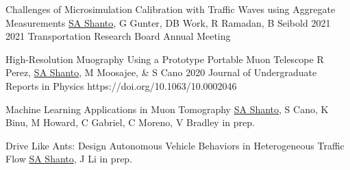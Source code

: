 
\begin{cvpublications}{}
    {Challenges of Microsimulation Calibration with Traffic Waves using Aggregate Measurements}	
    {\underline{SA Shanto}, G Gunter, DB Work, R Ramadan, B Seibold}
    {2021}
    {2021 Transportation Research Board Annual Meeting}
    {}


    {High-Resolution Muography Using a Prototype Portable Muon Telescope}	
    {R Perez, \underline{SA Shanto}, M Moosajee, \& S Cano}
    {2020}
    {Journal of Undergraduate Reports in Physics}
    {https://doi.org/10.1063/10.0002046}


    {Machine Learning Applications in Muon Tomography}	
    {\underline{SA Shanto}, S Cano, K Binu,  M Howard, C Gabriel, C Moreno, V Bradley}
    {in prep.}
    {}
    {}

    {Drive Like Ants: Design Autonomous Vehicle Behaviors in Heterogeneous Traffic Flow}	
    {\underline{SA Shanto}, J Li}
    {in prep.}
    {}
    {}







\end{cvpublications}


